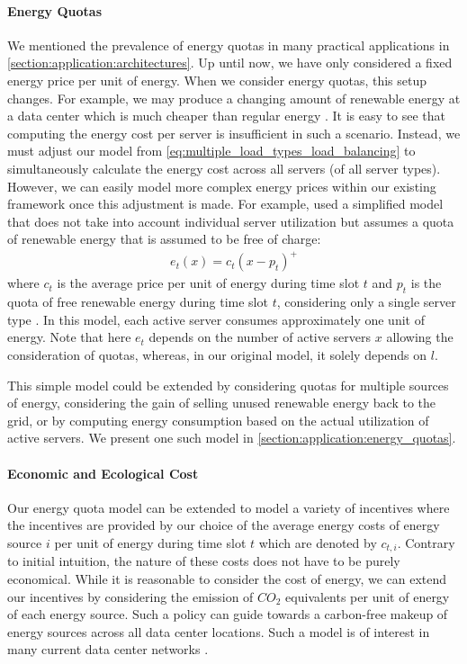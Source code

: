 \paragraph{Energy Quotas} We mentioned the prevalence of energy quotas in many practical applications in \autoref{section:application:architectures}. Up until now, we have only considered a fixed energy price per unit of energy. When we consider energy quotas, this setup changes. For example, we may produce a changing amount of renewable energy at a data center which is much cheaper than regular energy \cite{Lin2012}. It is easy to see that computing the energy cost per server is insufficient in such a scenario. Instead, we must adjust our model from \autoref{eq:multiple_load_types_load_balancing} to simultaneously calculate the energy cost across all servers (of all server types). However, we can easily model more complex energy prices within our existing framework once this adjustment is made. For example, \citeauthor*{Lin2012} used a simplified model that does not take into account individual server utilization but assumes a quota of renewable energy that is assumed to be free of charge: \begin{align*}
    e_t(x) = c_{t}(x - p_t)^+
\end{align*} where $c_t$ is the average price per unit of energy during time slot $t$ and $p_t$ is the quota of free renewable energy during time slot $t$, considering only a single server type \cite{Lin2012}. In this model, each active server consumes approximately one unit of energy. Note that here $e_t$ depends on the number of active servers $x$ allowing the consideration of quotas, whereas, in our original model, it solely depends on $l$.

This simple model could be extended by considering quotas for multiple sources of energy, considering the gain of selling unused renewable energy back to the grid, or by computing energy consumption based on the actual utilization of active servers. We present one such model in \autoref{section:application:energy_quotas}.

\paragraph{Economic and Ecological Cost} Our energy quota model can be extended to model a variety of incentives where the incentives are provided by our choice of the average energy costs of energy source $i$ per unit of energy during time slot $t$ which are denoted by $c_{t,i}$. Contrary to initial intuition, the nature of these costs does not have to be purely economical. While it is reasonable to consider the cost of energy, we can extend our incentives by considering the emission of $CO_2$ equivalents per unit of energy of each energy source. Such a policy can guide towards a carbon-free makeup of energy sources across all data center locations. Such a model is of interest in many current data center networks \cite{Hölzle2020, Miller2021}.

